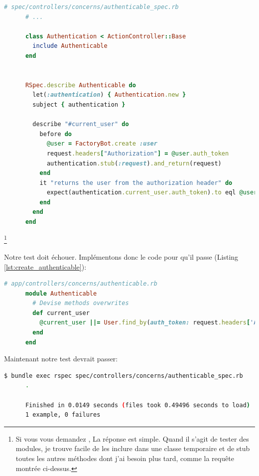 \documentclass[]{report}
\begin{document}
    \begin{scriptsize}
      \begin{lstlisting}[language=ruby]
      # spec/controllers/concerns/authenticable_spec.rb
      # ...

      class Authentication < ActionController::Base
        include Authenticable
      end


      RSpec.describe Authenticable do
        let(:authentication) { Authentication.new }
        subject { authentication }

        describe "#current_user" do
          before do
            @user = FactoryBot.create :user
            request.headers["Authorization"] = @user.auth_token
            authentication.stub(:request).and_return(request)
          end
          it "returns the user from the authorization header" do
            expect(authentication.current_user.auth_token).to eql @user.auth_token
          end
        end
      end
      \end{lstlisting}
    \end{scriptsize}
    \footnote{Si vous vous demandez , La réponse est simple. Quand il s'agit de tester des modules, je trouve facile de les inclure dans une classe temporaire et de stub toutes les autres méthodes dont j'ai besoin plus tard, comme la requête montrée ci-dessus.}

    Notre test doit échouer. Implémentons donc le code pour qu'il passe (Listing \ref{lst:create_authenticable}):

    \begin{scriptsize}
      \begin{lstlisting}[language=ruby, caption={Implémentation de la méthode current\_user}, label={lst:create_authenticable}]
      # app/controllers/concerns/authenticable.rb
      module Authenticable
        # Devise methods overwrites
        def current_user
          @current_user ||= User.find_by(auth_token: request.headers['Authorization'])
        end
      end
      \end{lstlisting}
    \end{scriptsize}

    Maintenant notre test devrait passer:

    \begin{scriptsize}
      \begin{lstlisting}[language=bash]
      $ bundle exec rspec spec/controllers/concerns/authenticable_spec.rb
      .

      Finished in 0.0149 seconds (files took 0.49496 seconds to load)
      1 example, 0 failures
      \end{lstlisting}
    \end{scriptsize}
\end{document}
